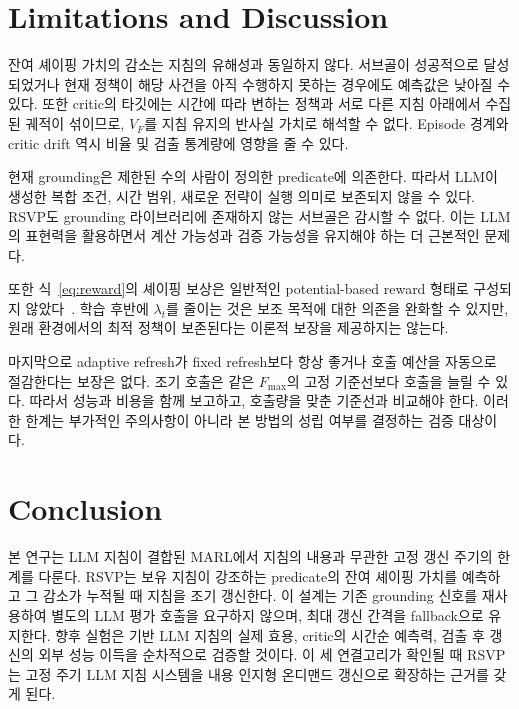 \section{Limitations and Discussion}

잔여 셰이핑 가치의 감소는 지침의 유해성과 동일하지 않다. 서브골이 성공적으로
달성되었거나 현재 정책이 해당 사건을 아직 수행하지 못하는 경우에도 예측값은 낮아질
수 있다. 또한 critic의 타깃에는 시간에 따라 변하는 정책과 서로 다른 지침 아래에서
수집된 궤적이 섞이므로, $\widehat V_F$를 지침 유지의 반사실 가치로 해석할 수 없다.
Episode 경계와 critic drift 역시 비율 및 검출 통계량에 영향을 줄 수 있다.

현재 grounding은 제한된 수의 사람이 정의한 predicate에 의존한다. 따라서 LLM이
생성한 복합 조건, 시간 범위, 새로운 전략이 실행 의미로 보존되지 않을 수 있다.
RSVP도 grounding 라이브러리에 존재하지 않는 서브골은 감시할 수 없다. 이는 LLM의
표현력을 활용하면서 계산 가능성과 검증 가능성을 유지해야 하는 더 근본적인 문제다.

또한 식~\eqref{eq:reward}의 셰이핑 보상은 일반적인 potential-based reward
형태로 구성되지 않았다~\cite{ng1999shaping}. 학습 후반에 $\lambda_t$를 줄이는 것은
보조 목적에 대한 의존을 완화할 수 있지만, 원래 환경에서의 최적 정책이 보존된다는
이론적 보장을 제공하지는 않는다.

마지막으로 adaptive refresh가 fixed refresh보다 항상 좋거나 호출 예산을 자동으로
절감한다는 보장은 없다. 조기 호출은 같은 $F_{\max}$의 고정 기준선보다 호출을 늘릴
수 있다. 따라서 성능과 비용을 함께 보고하고, 호출량을 맞춘 기준선과 비교해야 한다.
이러한 한계는 부가적인 주의사항이 아니라 본 방법의 성립 여부를 결정하는 검증 대상이다.

\section{Conclusion}

본 연구는 LLM 지침이 결합된 MARL에서 지침의 내용과 무관한 고정 갱신 주기의 한계를
다룬다. RSVP는 보유 지침이 강조하는 predicate의 잔여 셰이핑 가치를 예측하고 그
감소가 누적될 때 지침을 조기 갱신한다. 이 설계는 기존 grounding 신호를 재사용하여
별도의 LLM 평가 호출을 요구하지 않으며, 최대 갱신 간격을 fallback으로 유지한다.
향후 실험은 기반 LLM 지침의 실제 효용, critic의 시간순 예측력, 검출 후 갱신의 외부
성능 이득을 순차적으로 검증할 것이다. 이 세 연결고리가 확인될 때 RSVP는 고정 주기
LLM 지침 시스템을 내용 인지형 온디맨드 갱신으로 확장하는 근거를 갖게 된다.
